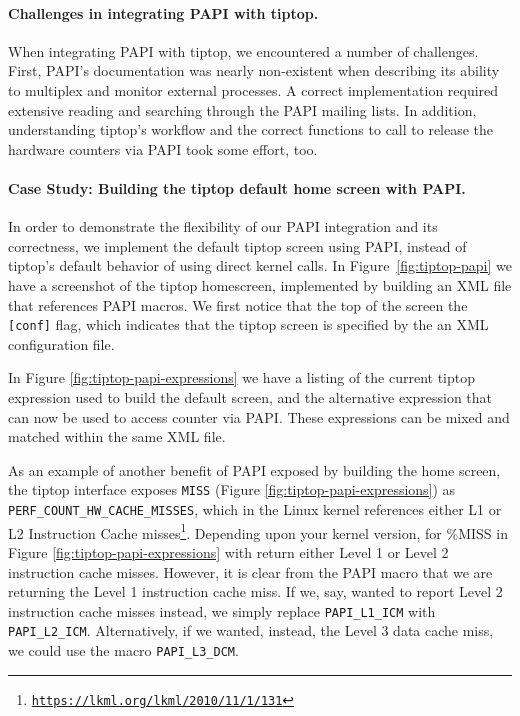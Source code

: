 \paragraph{Challenges in integrating PAPI with tiptop.}
When integrating PAPI with tiptop, we encountered a number of challenges.
First, PAPI's documentation was nearly non-existent when describing its ability to multiplex and monitor external processes.
A correct implementation required extensive reading and searching through the PAPI mailing lists.
In addition, understanding tiptop's workflow and the correct functions to call to release the hardware counters via PAPI took some effort, too.

\paragraph{Case Study: Building the tiptop default home screen with PAPI.}
In order to demonstrate the flexibility of our PAPI integration and its correctness, we implement the default tiptop screen using PAPI, instead of tiptop's default behavior of using direct kernel calls.
In Figure~\ref{fig:tiptop-papi} we have a screenshot of the tiptop homescreen, implemented by building an XML file that references PAPI macros.
We first notice that the top of the screen the \texttt{[conf]} flag, which indicates that the tiptop screen is specified by the an XML configuration file.

In Figure \ref{fig:tiptop-papi-expressions} we have a listing of the current tiptop expression used to build the default screen, and the alternative expression that can now be used to access counter via PAPI. These expressions can be mixed and matched within the same XML file.

As an example of another benefit of PAPI exposed by building the home screen, the tiptop interface exposes \texttt{MISS} (Figure \ref{fig:tiptop-papi-expressions}) as \texttt{PERF\_COUNT\_HW\_CACHE\_MISSES}, which in the Linux kernel references either L1 or L2 Instruction Cache misses\footnote{\texttt{\url{https://lkml.org/lkml/2010/11/1/131}}}.
Depending upon your kernel version, for \%MISS in Figure \ref{fig:tiptop-papi-expressions} with return either Level 1 or Level 2 instruction cache misses. However, it is clear from the PAPI macro that we are returning the Level 1 instruction cache miss. If we, say, wanted to report Level 2 instruction cache misses instead, we simply replace \texttt{PAPI\_L1\_ICM} with \texttt{PAPI\_L2\_ICM}.
Alternatively, if we wanted, instead, the Level 3 data cache miss, we could use the macro \texttt{PAPI\_L3\_DCM}.

